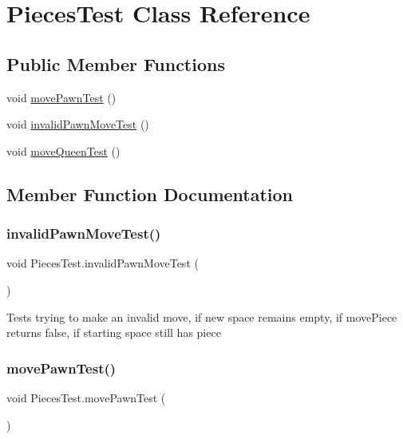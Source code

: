 \hypertarget{class_pieces_test}{}\section{Pieces\+Test Class Reference}
\label{class_pieces_test}
\subsection*{Public Member Functions}
\begin{DoxyCompactItemize}
\item 
void \mbox{\hyperlink{class_pieces_test_a32039649b9a6a0c21fe3135f9ed063cd}{move\+Pawn\+Test}} ()
\item 
void \mbox{\hyperlink{class_pieces_test_a591c1b90d97cdf541e52f2021d0cfd53}{invalid\+Pawn\+Move\+Test}} ()
\item 
void \mbox{\hyperlink{class_pieces_test_abadaa0c61122f01bae430ba068296914}{move\+Queen\+Test}} ()
\end{DoxyCompactItemize}


\subsection{Member Function Documentation}
\mbox{\label{class_pieces_test_a591c1b90d97cdf541e52f2021d0cfd53}} 
\subsubsection{\texorpdfstring{invalidPawnMoveTest()}{invalidPawnMoveTest()}}
{\footnotesize\ttfamily void Pieces\+Test.\+invalid\+Pawn\+Move\+Test (\begin{DoxyParamCaption}{ }\end{DoxyParamCaption})\hspace{0.3cm}{\ttfamily [inline]}}

Tests trying to make an invalid move, if new space remains empty, if move\+Piece returns false, if starting space still has piece \mbox{\label{class_pieces_test_a32039649b9a6a0c21fe3135f9ed063cd}} 
\subsubsection{\texorpdfstring{movePawnTest()}{movePawnTest()}}
{\footnotesize\ttfamily void Pieces\+Test.\+move\+Pawn\+Test (\begin{DoxyParamCaption}{ }\end{DoxyParamCaption})\hspace{0.3cm}{\ttfamily [inline]}}

